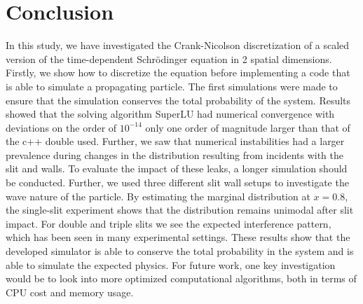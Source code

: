 \documentclass[../main_proj5e.tex]{subfiles}
\begin{document}
\section{Conclusion}\label{sec:p5_conclusion}

In this study, we have investigated the Crank-Nicolson discretization of a scaled version of the time-dependent Schr\"odinger equation in 2 spatial dimensions. Firstly, we show how to discretize the equation before implementing a code that is able to simulate a propagating particle. The first simulations were made to ensure that the simulation conserves the total probability of the system. Results showed that the solving algorithm SuperLU had numerical convergence with deviations on the order of $10^{-14}$ only one order of magnitude larger than that of the c++ double used. Further, we saw that numerical instabilities had a larger prevalence during changes in the distribution resulting from incidents with the slit and walls. To evaluate the impact of these leaks, a longer simulation should be conducted. Further, we used three different slit wall setups to investigate the wave nature of the particle. By estimating the marginal distribution at $x=0.8$, the single-slit experiment shows that the distribution remains unimodal after slit impact. For double and triple slits we see the expected interference pattern, which has been seen in many experimental settings. These results show that the developed simulator is able to conserve the total probability in the system and is able to simulate the expected physics. For future work, one key investigation would be to look into more optimized computational algorithms, both in terms of CPU cost and memory usage.
\end{document}
